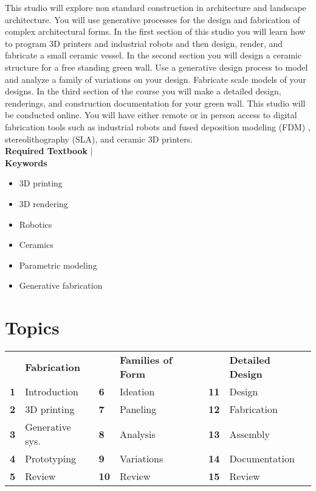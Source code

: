 \documentclass[11pt,article,oneside]{memoir}
\begin{document}
This studio will explore non standard construction 
in architecture and landscape architecture.
You will use generative processes 
for the design and fabrication 
of complex architectural forms. 
In the first section of this studio you will 
learn how to program 3D printers and industrial robots 
and then design, render, and fabricate 
a small ceramic vessel.  
In the second section you will design 
a ceramic structure for a free standing green wall.
Use a generative design process to model 
and analyze a family of variations on your design.
Fabricate scale models of your designs.  
In the third section of the course 
you will make a detailed design, renderings,  
and construction documentation
for your green wall. 
This studio will be conducted online. 
You will have either remote or in person access 
to digital fabrication tools
such as industrial robots and 
fused deposition modeling (FDM) ,
stereolithography (SLA), and ceramic 3D printers.\\

\noindent\textbf{Required Textbook} |
\\

\noindent\textbf{Keywords}
\begin{multicols}{3}
\raggedright
\small
\begin{itemize}
\item 3D printing
\item 3D rendering
\item Robotics
\item Ceramics
\item Parametric modeling
\item Generative fabrication
\end{itemize}
\end{multicols}

\section{Topics}

\vspace*{-1em}
%
\begin{table}[H]
\begin{tabular}{l l @{\hskip 0.5cm} l l @{\hskip 0.5cm} l l}
 & \textbf{Fabrication} & & \textbf{Families of Form} && \textbf{Detailed Design}\\
\small
\textbf{1} & Introduction & \textbf{6} & Ideation & \textbf{11} & Design\\
\textbf{2} & 3D printing & \textbf{7} & Paneling & \textbf{12} & Fabrication\\
\textbf{3} & Generative sys. & \textbf{8} & Analysis & \textbf{13} & Assembly\\
\textbf{4} & Prototyping & \textbf{9} & Variations & \textbf{14} & Documentation\\
\textbf{5} & Review & \textbf{10} & Review & \textbf{15} & Review\\
\end{tabular}
\end{table}
\end{document}
